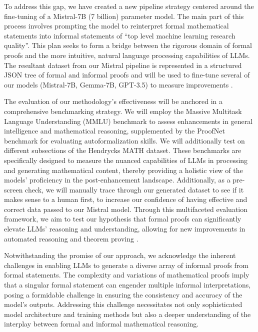 To address this gap, we have created a new pipeline strategy centered around the fine-tuning of a Mistral-7B (7 billion) parameter model. The main part of this process involves prompting the model to reinterpret formal mathematical statements into informal statements of ``top level machine learning research quality''. This plan seeks to form a bridge between the rigorous domain of formal proofs and the more intuitive, natural language processing capabilities of LLMs. The resultant dataset from our Mistral pipeline is represented in a structured JSON tree of formal and informal proofs and will be used to fine-tune several of our models (Mistral-7B, Gemma-7B, GPT-3.5) to measure improvements \cite{yang2023leandojo} \cite{jiang2023draft}.

The evaluation of our methodology's effectiveness will be anchored in a comprehensive benchmarking strategy. We will employ the Massive Multitask Language Understanding (MMLU) benchmark to assess enhancements in general intelligence and mathematical reasoning, supplemented by the ProofNet benchmark for evaluating autoformalization skills. We will additionally test on different subsections of the Hendrycks MATH dataset. These benchmarks are specifically designed to measure the nuanced capabilities of LLMs in processing and generating mathematical content, thereby providing a holistic view of the models' proficiency in the post-enhancement landscape. Additionally, as a pre-screen check, we will manually trace through our generated dataset to see if it makes sense to a human first, to increase our confidence of having effective and correct data passed to our Mistral model. Through this multifaceted evaluation framework, we aim to test our hypothesis that formal proofs can significantly elevate LLMs' reasoning and understanding, allowing for new improvements in automated reasoning and theorem proving \cite{hendrycks2021measuring} \cite{polu2020generative}.

Notwithstanding the promise of our approach, we acknowledge the inherent challenges in enabling LLMs to generate a diverse array of informal proofs from formal statements. The complexity and variations of mathematical proofs imply that a singular formal statement can engender multiple informal interpretations, posing a formidable challenge in ensuring the consistency and accuracy of the model's outputs. Addressing this challenge necessitates not only sophisticated model architecture and training methods but also a deeper understanding of the interplay between formal and informal mathematical reasoning.

